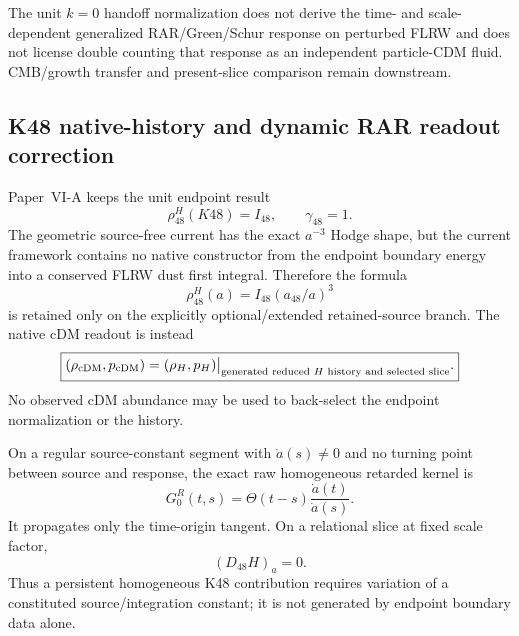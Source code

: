 \documentclass[12pt,a4paper]{article}
\begin{document}
\begin{remark}
\label{p9:rem:v1105-k48-perturbation-frontier}
The unit $k=0$ handoff normalization does not derive the time- and
scale-dependent generalized RAR/Green/Schur response on perturbed FLRW and
does not license double counting that response as an independent particle-CDM
fluid.  CMB/growth transfer and present-slice comparison remain downstream.
\end{remark}

\subsection{K48 native-history and dynamic RAR readout correction}
\label{p9:sec:v1107-k48-rar-dynamic-readout}

\begin{corollary}
\label{p9:cor:v1107-k48-endpoint-readout-retype}
Paper~VI-A keeps the unit endpoint result
\[
 \boxed{\rho_{48}^{H}(K48)=I_{48},\qquad \gamma_{48}=1.}
\]
The geometric source-free current has the exact $a^{-3}$ Hodge shape, but the
current framework contains no native constructor from the endpoint boundary
energy into a conserved FLRW dust first integral.  Therefore the formula
\[
 \rho_{48}^{H}(a)=I_{48}(a_{48}/a)^3
\]
is retained only on the explicitly optional/extended retained-source branch.
The native cDM readout is instead
\[
 \boxed{
 (\rho_{\rm cDM},p_{\rm cDM})
 =(\rho_H,p_H)\big|_{\text{generated reduced }H\text{ history and selected slice}}.}
\]
No observed cDM abundance may be used to back-select the endpoint normalization
or the history.
\end{corollary}

\begin{corollary}
\label{p9:cor:v1107-k48-n0-readout}
On a regular source-constant segment with \(\dot a(s)\neq0\) and no
turning point between source and response, the exact raw homogeneous retarded
kernel is
\[
 G_0^R(t,s)=\Theta(t-s)\frac{\dot a(t)}{\dot a(s)}.
\]
It propagates only the time-origin tangent.  On a relational slice at fixed
scale factor,
\[
 \boxed{(D_{48}H)_a=0.}
\]
Thus a persistent homogeneous K48 contribution requires variation of a
constituted source/integration constant; it is not generated by endpoint
boundary data alone.
\end{corollary}
\end{document}
